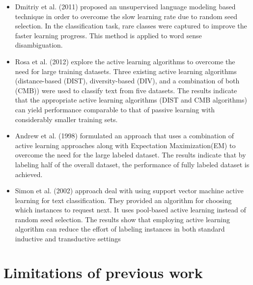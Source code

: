 \begin{itemize}
	\item Dmitriy et al. (2011) \cite{dligach2011} proposed an unsupervised language modeling based technique in order to overcome the slow learning rate due to random seed selection. In the classification task, rare classes were captured to improve the faster learning progress. This method is applied to word sense disambiguation.
	\item Rosa et al. (2012) \cite{figueroa2012} explore the active learning algorithms to overcome the need for large training datasets. Three existing active learning algorithms (distance-based (DIST), diversity-based (DIV), and a combination of both (CMB)) were used to classify text from five datasets.  The results indicate that the appropriate active learning algorithms (DIST and CMB algorithms) can yield performance comparable to that of passive learning with considerably smaller training sets.
	\item Andrew et al. (1998) \cite{mccallumzy1998} formulated an approach that uses a combination of active learning approaches along with Expectation Maximization(EM)  to overcome the need for the large labeled dataset. The results indicate that by labeling half of the overall dataset, the performance of fully labeled dataset is achieved.
	\item Simon et al. (2002)\cite{tong2001} approach deal with using support vector machine active learning for text classification. They provided an algorithm for choosing which instances to request next. It uses pool-based active learning instead of random seed selection. The results show that employing active learning algorithm can reduce the effort of labeling instances in both standard inductive and transductive settings
	
\end{itemize}

\section{Limitations of previous work}
